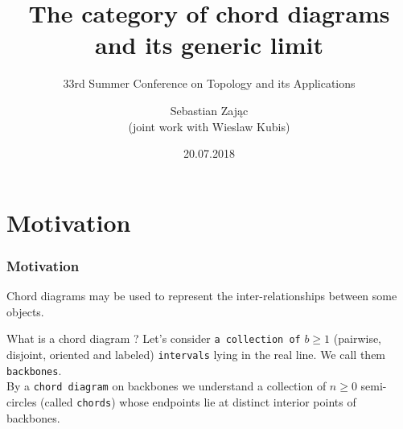 \documentclass{beamer}
\title[Chord diagrams category]{The category of chord diagrams and its generic limit}
\subtitle{33rd Summer Conference on Topology and its Applications}
\author[S. Zajac and W. Kubis ]{Sebastian Zając \\(joint work with Wieslaw Kubis)}
\institute[UKSW]{Cardinal Stefan Wyszynski University in Warsaw }
\date{20.07.2018}
\theoremstyle{definition}
\theoremstyle{remark}
\begin{document}
\frame{\titlepage}

\section[Outline]{}
\frame{\tableofcontents}

%
\section{Motivation}

\frame
{
  \frametitle{Motivation}
  \begin{block}{}
 Chord diagrams may be used to represent the inter-relationships between some objects. 
\end{block}
\begin{block}{
What is a chord diagram  ? }
Let's consider \texttt{a collection of} $b\geqslant 1$ (pairwise, disjoint, oriented and labeled) \texttt{intervals} lying in the real line. We call them {\tt backbones}. \\ By a {\tt chord diagram} on backbones we understand a collection of $n \geqslant 0$ semi-circles (called {\tt chords}) whose endpoints lie at distinct interior points of backbones.
\end{block}

 
}

%
%
%
\end{document}
